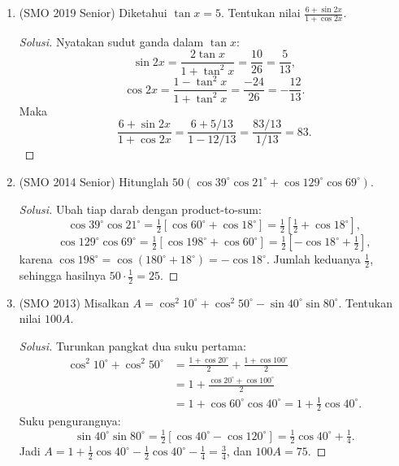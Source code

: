 \documentclass[12pt]{scrartcl}
\begin{document}
\begin{enumerate}
	\item (SMO 2019 Senior)
	Diketahui $\tan x = 5$. Tentukan nilai $\frac{6+\sin 2x}{1+\cos 2x}$.
	\begin{proof}[Solusi]
	Nyatakan sudut ganda dalam $\tan x$:
	\[ \sin 2x = \frac{2\tan x}{1+\tan^2 x} = \frac{10}{26} = \frac{5}{13}, \]
	\[ \cos 2x = \frac{1-\tan^2 x}{1+\tan^2 x} = \frac{-24}{26} = -\frac{12}{13}. \]
	Maka
	\[ \frac{6+\sin 2x}{1+\cos 2x}
	= \frac{6+5/13}{1-12/13} = \frac{83/13}{1/13} = 83. \]
	\end{proof}

	\item (SMO 2014 Senior)
	Hitunglah $50(\cos 39^{\circ}\cos 21^{\circ}
	+ \cos 129^{\circ}\cos 69^{\circ})$.
	\begin{proof}[Solusi]
	Ubah tiap darab dengan product-to-sum:
	\[ \cos 39^{\circ}\cos 21^{\circ}
	= \tfrac12[\cos 60^{\circ} + \cos 18^{\circ}]
	= \tfrac12\left[\tfrac12 + \cos 18^{\circ}\right], \]
	\[ \cos 129^{\circ}\cos 69^{\circ}
	= \tfrac12[\cos 198^{\circ} + \cos 60^{\circ}]
	= \tfrac12\left[-\cos 18^{\circ} + \tfrac12\right], \]
	karena $\cos 198^{\circ} = \cos(180^{\circ}+18^{\circ}) = -\cos 18^{\circ}$.
	Jumlah keduanya $\frac12$, sehingga hasilnya $50 \cdot \frac12 = 25$.
	\end{proof}

	\item (SMO 2013)
	Misalkan $A = \cos^2 10^{\circ} + \cos^2 50^{\circ}
	- \sin 40^{\circ}\sin 80^{\circ}$. Tentukan nilai $100A$.
	\begin{proof}[Solusi]
	Turunkan pangkat dua suku pertama:
	\begin{align*}
	\cos^2 10^{\circ} + \cos^2 50^{\circ}
	&= \frac{1+\cos 20^{\circ}}{2} + \frac{1+\cos 100^{\circ}}{2} \\
	&= 1 + \frac{\cos 20^{\circ}+\cos 100^{\circ}}{2} \\
	&= 1 + \cos 60^{\circ}\cos 40^{\circ} = 1 + \tfrac12\cos 40^{\circ}.
	\end{align*}
	Suku pengurangnya:
	\[ \sin 40^{\circ}\sin 80^{\circ}
	= \tfrac12[\cos 40^{\circ} - \cos 120^{\circ}]
	= \tfrac12\cos 40^{\circ} + \tfrac14. \]
	Jadi $A = 1 + \frac12\cos 40^{\circ} - \frac12\cos 40^{\circ} - \frac14
	= \frac34$, dan $100A = 75$.
	\end{proof}


\end{enumerate}
\end{document}
